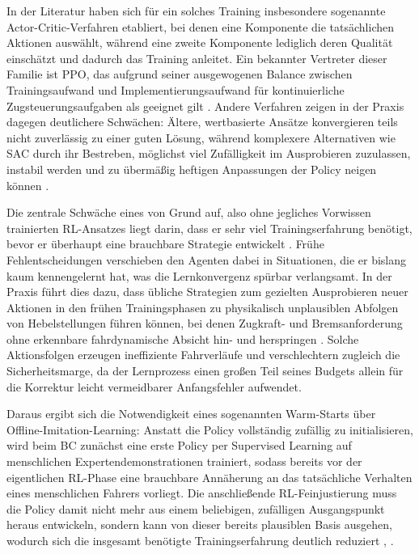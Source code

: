 In der Literatur haben sich für ein solches Training insbesondere sogenannte Actor-Critic-Verfahren etabliert, bei denen eine Komponente die tatsächlichen Aktionen auswählt, während eine zweite Komponente lediglich deren Qualität einschätzt und dadurch das Training anleitet. Ein bekannter Vertreter dieser Familie ist \gls{PPO}, das aufgrund seiner ausgewogenen Balance zwischen Trainingsaufwand und Implementierungsaufwand für kontinuierliche Zugsteuerungsaufgaben als geeignet gilt \cite[vgl.~S.~41ff.]{chap3_Mwa23}. Andere Verfahren zeigen in der Praxis dagegen deutlichere Schwächen: Ältere, wertbasierte Ansätze konvergieren teils nicht zuverlässig zu einer guten Lösung, während komplexere Alternativen wie \gls{SAC} durch ihr Bestreben, möglichst viel Zufälligkeit im Ausprobieren zuzulassen, instabil werden und zu übermäßig heftigen Anpassungen der Policy neigen können \cite[vgl.~S.~1]{chap3_Sha26}.

Die zentrale Schwäche eines von Grund auf, also ohne jegliches Vorwissen trainierten \gls{RL}-Ansatzes liegt darin, dass er sehr viel Trainingserfahrung benötigt, bevor er überhaupt eine brauchbare Strategie entwickelt \cite[S.~1]{chap3_Wan23}. Frühe Fehlentscheidungen verschieben den Agenten dabei in Situationen, die er bislang kaum kennengelernt hat, was die Lernkonvergenz spürbar verlangsamt. In der Praxis führt dies dazu, dass übliche Strategien zum gezielten Ausprobieren neuer Aktionen in den frühen Trainingsphasen zu physikalisch unplausiblen Abfolgen von Hebelstellungen führen können, bei denen Zugkraft- und Bremsanforderung ohne erkennbare fahrdynamische Absicht hin- und herspringen \cite[S.~2]{chap3_Lyu26}. Solche Aktionsfolgen erzeugen ineffiziente Fahrverläufe und verschlechtern zugleich die Sicherheitsmarge, da der Lernprozess einen großen Teil seines Budgets allein für die Korrektur leicht vermeidbarer Anfangsfehler aufwendet.

Daraus ergibt sich die Notwendigkeit eines sogenannten Warm-Starts über Offline-Imitation-Learning: Anstatt die Policy vollständig zufällig zu initialisieren, wird beim \gls{BC} zunächst eine erste Policy per Supervised Learning auf menschlichen Expertendemonstrationen trainiert, sodass bereits vor der eigentlichen \gls{RL}-Phase eine brauchbare Annäherung an das tatsächliche Verhalten eines menschlichen Fahrers vorliegt. Die anschließende \gls{RL}-Feinjustierung muss die Policy damit nicht mehr aus einem beliebigen, zufälligen Ausgangspunkt heraus entwickeln, sondern kann von dieser bereits plausiblen Basis ausgehen, wodurch sich die insgesamt benötigte Trainingserfahrung deutlich reduziert \cite[vgl.~S.~1]{chap1_Wexler22}, \cite[S.~5042]{chap1_Silva19}.

